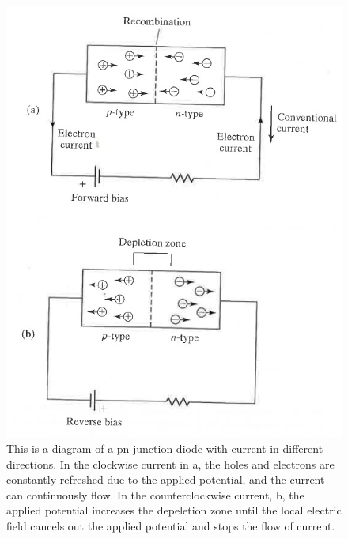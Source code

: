 \documentclass[ notitlepage, numerical, 11pt]{revtex4-1} %
\begin{document}
\begin{figure}[H]
\centerline{\includegraphics[scale=.5]{pnJunction.png}}
\caption{This is a diagram of a pn junction diode with current in different directions. In the clockwise current in a, the holes and electrons are constantly refreshed due to the applied potential, and the current can continuously flow. In the counterclockwise current, b, the applied potential increases the depeletion zone until the local electric field cancels out the applied potential and stops the flow of current.}
\label{pnJunction}
\end{figure}
\end{document}
